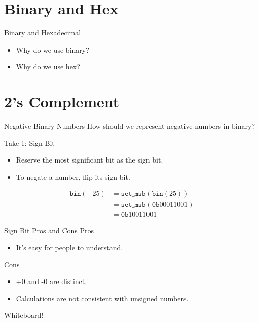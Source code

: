 \documentclass[hyphens,aspectratio=169,dvipsnames]{beamer}
\begin{document}
\section{Binary and Hex}

\begin{frame}{Binary and Hexadecimal}
    \begin{itemize}
        \pause \item Why do we use binary?
        \pause \item Why do we use hex?
    \end{itemize}
\end{frame}

\section{2's Complement}

\begin{frame}{Negative Binary Numbers}
    How should we represent negative numbers in binary?
\end{frame}

\begin{frame}{Take 1: Sign Bit}
    \begin{itemize}
        \pause \item Reserve the most significant bit as the sign bit.
        \pause \item To negate a number, flip its sign bit.
    \end{itemize}

    \begin{align*}
        \texttt{bin}(-25) &= \texttt{set\_msb}(\texttt{bin}(25)) \\
                          &= \texttt{set\_msb}(\texttt{0b}00011001) \\
                          &= \texttt{0b}10011001
    \end{align*}
\end{frame}

\begin{frame}{Sign Bit Pros and Cons}
    Pros
    \begin{itemize}
        \pause \item It's easy for people to understand.
    \end{itemize}

    \pause

    Cons
    \begin{itemize}
        \pause \item +0 and -0 are distinct.
        \pause \item Calculations are not consistent with unsigned numbers.
    \end{itemize}

    \pause
    \begin{center}Whiteboard!\end{center}
\end{frame}
\end{document}
